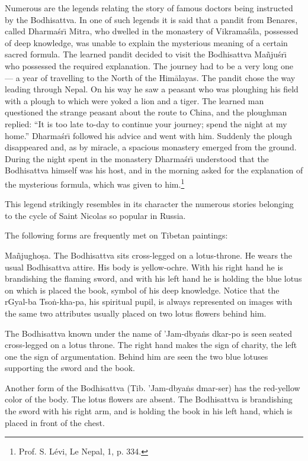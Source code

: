 \documentclass[a4paper, 12pt, oneside]{article}
\begin{document}
Numerous are the legends relating the story of famous doctors being instructed by the Bodhisattva. In one of such legends it is said that a pandit from Benares, called Dharma\'{s}r\={\i} Mitra, who dwelled in the monastery of Vikrama\'{s}\={\i}la, possessed of deep knowledge, was unable to explain the mysterious meaning of a certain sacred formula. The learned pandit decided to visit the Bodhisattva Ma\~{n}ju\'{s}r\={\i} who possessed the required explanation. The journey had to be a very long one --- a year of travelling to the North of the Him\={a}layas. The pandit chose the way leading through Nepal. On his way he saw a peasant who was ploughing his field with a plough to which were yoked a lion and a tiger. The learned man questioned the strange peasant about the route to China, and the ploughman replied: ``It is too late to-day to continue your journey; spend the night at my home.'' Dharma\'{s}r\={\i} followed his advice and went with him. Suddenly the plough disappeared and, as by miracle, a spacious monastery emerged from the ground. During the night spent in the monastery Dharma\'{s}r\={\i} understood that the Bodhisattva himself was his host, and in the morning asked for the explanation of the mysterious formula, which was given to him.\footnote{Prof. S. Lévi, Le Nepal, 1, p. 334.}

This legend strikingly resembles in its character the numerous stories belonging to the cycle of Saint Nicolas so popular in Russia.

The following forms are frequently met on Tibetan paintings:

Ma\~{n}jugho\d{s}a. The Bodhisattva sits cross-legged on a lotus-throne. He wears the usual Bodhisattva attire. His body is yellow-ochre. With his right hand he is brandishing the flaming sword, and with his left hand he is holding the blue lotus on which is placed the book, symbol of his deep knowledge. Notice that the rGyal-ba Tso\.{n}-kha-pa, his spiritual pupil, is always represented on images with the same two attributes usually placed on two lotus flowers behind him.

The Bodhisattva known under the name of 'Jam-dbya\.{n}s dkar-po is seen seated cross-legged on a lotus throne. The right hand makes the sign of charity, the left one the sign of argumentation. Behind him are seen the two blue lotuses supporting the sword and the book.

Another form of the Bodhisattva (Tib. 'Jam-dbya\.{n}s dmar-ser) has the red-yellow color of the body. The lotus flowers are absent. The Bodhisattva is brandishing the sword with his right arm, and is holding the book in his left hand, which is placed in front of the chest.
\end{document}
